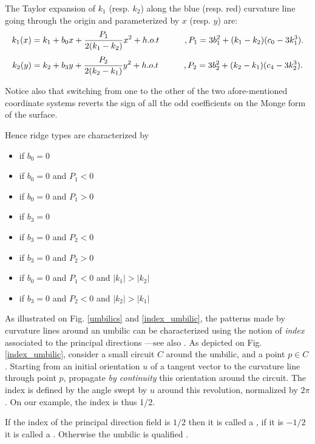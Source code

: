 \noindent The Taylor expansion of $k_1$ (resp. $k_2$) along the blue
(resp. red) curvature line going through the origin and parameterized
by $x$ (resp. $y$) are:
\begin{equation}
\label{eq:taylor_along_line}
k_1(x) = k_1 + b_0x + \frac{P_1}{2(k_1-k_2)}x^2 +h.o.t \quad \quad \quad,
P_1= 3b_1^2+(k_1-k_2)(c_0-3k_1^3).
\end{equation}
%
\begin{equation}
\label{eq:taylor_along_red_line}
k_2(y) = k_2 + b_3y + \frac{P_2}{2(k_2-k_1)}y^2 +h.o.t \quad \quad \quad,
P_2= 3b_2^2+(k_2-k_1)(c_4-3k_2^3).
\end{equation}

\noindent Notice also that switching from one to the other of the two
afore-mentioned coordinate systems reverts the sign of all the odd
coefficients on the Monge form of the surface.
\medskip

Hence ridge types are characterized by 
\begin{itemize}
\item
{} if $b_0=0$
\item
{} if  $b_0=0$ and $P_1<0$
\item
  if  $b_0=0$ and $P_1>0$
\item
  if  $b_3=0$
\item
  if  $b_3=0$ and $P_2<0$
\item
{} if  $b_3=0$ and $P_2>0$
\item
{} if  $b_0=0$  and $P_1<0$ and $|k_1|>|k_2|$
\item
{} if  $b_3=0$ and $P_2<0$ and $|k_2|>|k_1|$
\end{itemize}


As illustrated on Fig. \ref{umbilics} and \ref{index_umbilic}, the
patterns made by curvature lines around an umbilic can be
characterized using the notion of {\em index} associated to the
principal directions ---see also \cite{cgal:cp-ssulc-05}.
As depicted on Fig. \ref{index_umbilic}, consider a small circuit $C$ around the
umbilic, and a point $p \in C$. Starting from an initial orientation
$u$ of a tangent vector to the curvature line through point $p$,
propagate {\em by continuity} this orientation around the circuit.  The
index is defined by the angle swept by $u$ around this revolution,
normalized by $2\pi$. On our example, the index is thus 1/2.

If the index of the principal direction field is $1/2$
then it is called a
, if it is $-1/2$ it is called a .
 Otherwise the umbilic is qualified
.


